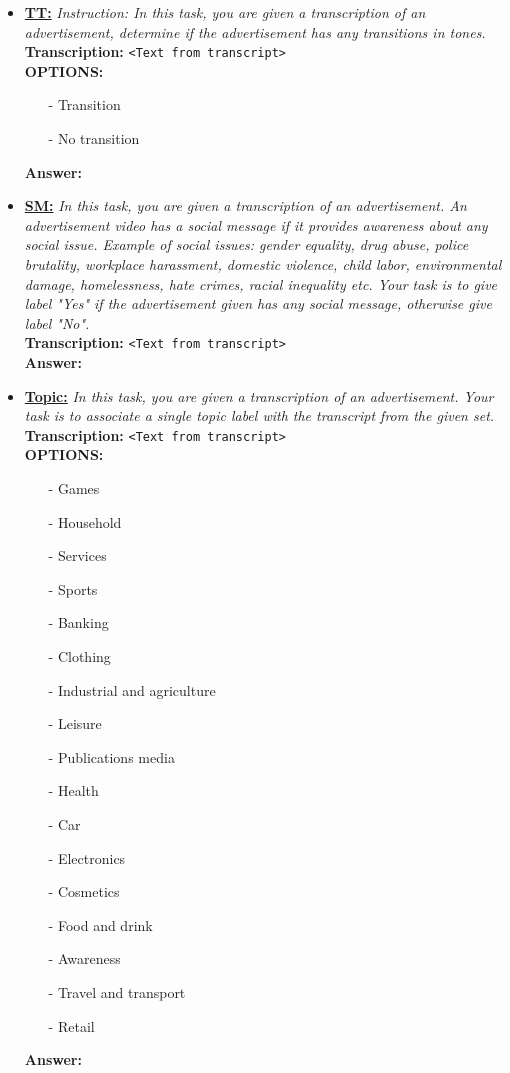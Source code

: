 \begin{itemize}

    \item \textbf{\underline{TT:}} \textit{Instruction: In this task, you are given a transcription of an advertisement, determine if the advertisement has any transitions in tones.} \\
    \textbf{Transcription:} \texttt{<Text from transcript>}\\
    \textbf{OPTIONS:}
    \begin{itemize}
    \item[-] Transition
    \item[-] No transition
    \end{itemize}
   \textbf{Answer:}

    \item \textbf{\underline{SM:}} \textit{In this task, you are given a transcription of an advertisement. An advertisement video has a social message if it provides awareness about any social issue. Example of social issues: gender equality, drug abuse, police brutality, workplace harassment, domestic violence, child labor, environmental damage, homelessness, hate crimes, racial inequality etc. Your task is to give label "Yes" if the advertisement given has any social message, otherwise give label "No".} \\
    \textbf{Transcription:} \texttt{<Text from transcript>}\\
    \textbf{Answer:}
    
    \item \textbf{\underline{Topic:}} \textit{In this task, you are given a transcription of an advertisement. Your task is to associate a single topic label with the transcript from the given set.} \\
    \textbf{Transcription:} \texttt{<Text from transcript>}\\
    \textbf{OPTIONS:}
    \begin{itemize}
    \item [-] Games
    \item [-] Household
    \item [-] Services
    \item [-] Sports 
    \item [-] Banking 
    \item [-] Clothing 
    \item [-] Industrial and agriculture 
    \item [-] Leisure 
    \item [-] Publications media 
    \item [-] Health 
    \item [-] Car 
    \item [-] Electronics 
    \item [-] Cosmetics 
    \item [-] Food and drink 
    \item [-] Awareness 
    \item [-] Travel and transport 
    \item [-] Retail 
    \end{itemize}
    \textbf{Answer:}
\end{itemize}

